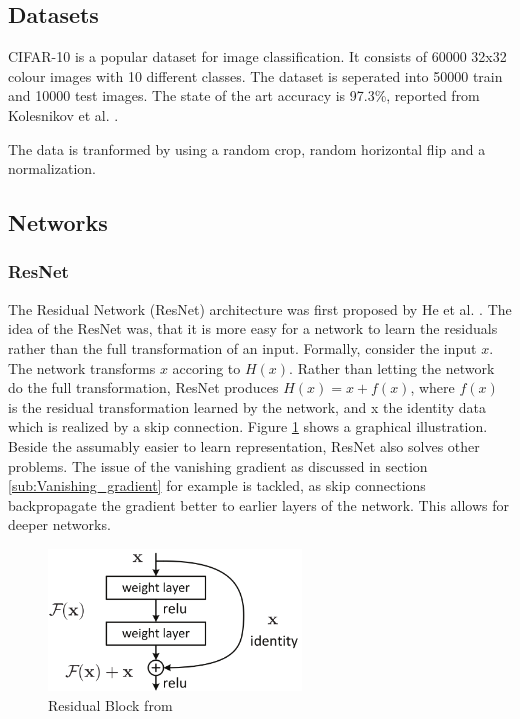 \subsection{Datasets}
CIFAR-10 \cite{CIFAR-10} is a popular dataset for image classification. It
consists of 60000 32x32 colour images with 10 different classes. The dataset is
seperated into 50000 train and 10000 test images. The state of the art accuracy
is 97.3\%, reported from Kolesnikov et al. \cite{kolesnikov2019big}.

The data is tranformed by using a random crop, random horizontal flip and a
normalization.


\subsection{Networks}
\subsubsection{ResNet}
The Residual Network (ResNet) architecture was first proposed by He et al.
\cite{he2016deep}. The idea of the ResNet was, that it is more easy for a
network to learn the residuals rather than the full transformation of an input.
Formally, consider the input $x$. The network transforms $x$ accoring to $H(x)$.
Rather than letting the network do the full transformation, ResNet produces
$H(x)= x +f(x)$, where $f(x)$ is the residual transformation learned by the
network, and x the identity data which is realized by a skip connection. Figure
\ref{fig:Residual_Block} shows a graphical illustration. Beside the assumably
easier to learn representation, ResNet also solves other problems. The issue of
the vanishing gradient as discussed in section \ref{sub:Vanishing_gradient} for
example is tackled, as skip connections backpropagate the gradient better to
earlier layers of the network. This allows for deeper networks.

\begin{figure}[h]\label{fig:Residual_Block}
    \centering
    \includegraphics[width=0.6\textwidth]{images/Residual_Block.png}
    \caption{Residual Block from \cite[Page 2]{he2016deep}\newline 
   }
\end{figure}

